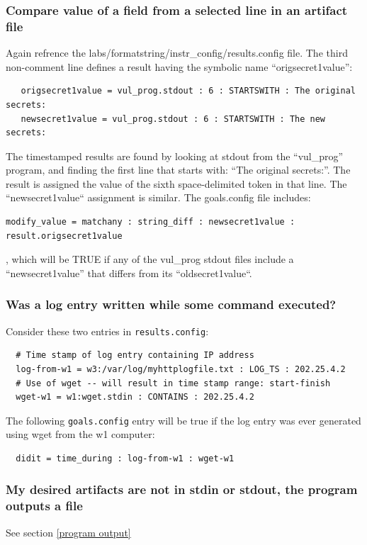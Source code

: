 \documentclass[12pt]{article}
\begin{document}
\subsubsection{Compare value of a field from a selected line in an artifact file}
Again refrence the labs/formatstring/instr\_config/results.config file.  The third non-comment line
defines a result having the symbolic name ``origsecret1value'':  
\begin{verbatim}
   origsecret1value = vul_prog.stdout : 6 : STARTSWITH : The original secrets:
   newsecret1value = vul_prog.stdout : 6 : STARTSWITH : The new secrets:
\end{verbatim}
\noindent The timestamped results are
found by looking at stdout from the ``vul\_prog'' program, and finding the first line that starts with:
``The original secrets:''.  The result is assigned the value of the sixth space-delimited 
token in that line.  The ``newsecret1value`` assignment is similar.  The goals.config file includes:
\begin{verbatim}
modify_value = matchany : string_diff : newsecret1value : result.origsecret1value
\end{verbatim}
\noindent , which will be TRUE if any of the vul\_prog stdout files include a
``newsecret1value'' that differs from its ``oldsecret1value``.

\subsubsection{Was a log entry written while some command executed?}
Consider these two entries in {\tt results.config}:
\begin{verbatim}
  # Time stamp of log entry containing IP address
  log-from-w1 = w3:/var/log/myhttplogfile.txt : LOG_TS : 202.25.4.2
  # Use of wget -- will result in time stamp range: start-finish
  wget-w1 = w1:wget.stdin : CONTAINS : 202.25.4.2
\end{verbatim}
\noindent The following {\tt goals.config} entry will be true if the log entry was 
ever generated using wget from the w1 computer:
\begin{verbatim}
  didit = time_during : log-from-w1 : wget-w1 
\end{verbatim}


\subsubsection{My desired artifacts are not in stdin or stdout, the program outputs a file}
See section \ref{program output}
\end{document}
